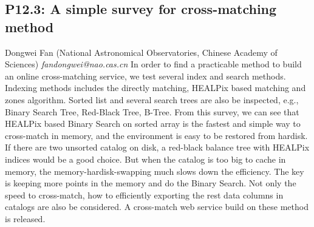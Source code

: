 \documentclass{report}
\begin{document}
\subsection*{P12.3: A simple survey for cross-matching method}
\bigskip
Dongwei Fan (National Astronomical Observatories, Chinese Academy of Sciences) \newline   \newline   \newline   \newline  \newline  \newline\newline
{\it fandongwei@nao.cas.cn}\newline
\newline\newline
In order to find a practicable method to build an online cross-matching service, we test several index and search methods. Indexing methods includes the directly matching, HEALPix based matching and zones algorithm. Sorted list and several search trees are also be inspected, e.g., Binary Search Tree, Red-Black Tree, B-Tree. From this survey, we can see that HEALPix based Binary Search on sorted array is the fastest and simple way to cross-match in memory, and the environment is easy to be restored from hardisk. If there are two unsorted catalog on disk, a red-black balance tree with HEALPix indices would be a good choice. But when the catalog is too big to cache in memory, the memory-hardisk-swapping much slows down the efficiency. The key is keeping more points in the memory and do the Binary Search. Not only the speed to cross-match, how to efficiently exporting the rest data columns in catalogs are also be considered. A cross-match web service build on these method is released.\newline
\newpage
\end{document}
